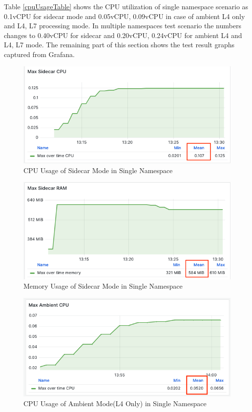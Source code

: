 Table \ref{cpuUsageTable} shows the CPU utilization of single namespace scenario as 0.1vCPU for sidecar mode and 0.05vCPU, 0.09vCPU in case of ambient L4 only and L4, L7 processing mode. In multiple namespaces test scenario the numbers changes to 0.40vCPU for sidecar and 0.20vCPU, 0.24vCPU for ambient L4 and L4, L7 mode. The remaining part of this section shows the test result graphs captured from Grafana.

\begin{figure}[H]
  \centering
  \includegraphics[width=0.8\linewidth]{resources/max-sidecar-cpu.png}
  \caption{CPU Usage of Sidecar Mode in Single Namespace}
\end{figure}

\begin{figure}[H]
  \centering
  \includegraphics[width=0.8\linewidth]{resources/max-sidecar-mem.png}
  \caption{Memory Usage of Sidecar Mode in Single Namespace}
\end{figure}

\begin{figure}[H]
  \centering
  \includegraphics[width=0.8\linewidth]{resources/max-ambient-l4-cpu.png}
  \caption{CPU Usage of Ambient Mode(L4 Only) in Single Namespace}
\end{figure}

